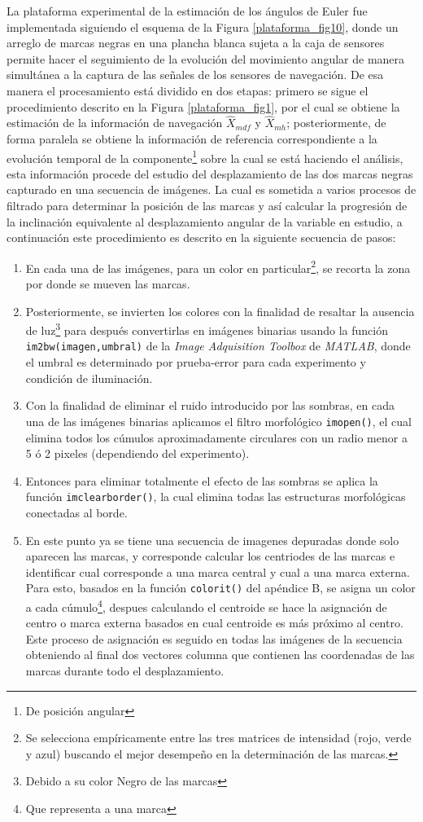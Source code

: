 \documentclass[conference]{IEEEtran}
\begin{document}
\begin{enumerate}
La plataforma experimental de la estimación de los ángulos de Euler fue implementada siguiendo el esquema de la Figura \ref{plataforma_fig10}, donde un arreglo de marcas negras en una plancha blanca sujeta a la caja de sensores permite hacer el seguimiento de la evolución del movimiento angular de manera simultánea a la captura de las señales de los sensores de navegación. De esa manera el procesamiento está dividido en dos etapas: primero se sigue el procedimiento descrito en la Figura \ref{plataforma_fig1}, por el cual se obtiene la estimación de la información de navegación $\hat{X}_{mdf}$ y $\hat{X}_{mh}$; posteriormente, de forma paralela se obtiene la información de referencia correspondiente a la evolución temporal de la componente\footnote{De posición angular} sobre la cual se está haciendo el análisis, esta información procede del estudio del desplazamiento de las dos marcas negras capturado en una secuencia de imágenes. La cual es sometida a varios procesos de filtrado para determinar la posición de las marcas y así calcular la progresión de la inclinación equivalente al desplazamiento angular de la variable en estudio, a continuación este procedimiento es descrito en la siguiente secuencia de pasos:
\begin{enumerate}
\item En cada una de las imágenes, para un color en particular\footnote{Se selecciona empíricamente entre las tres matrices de intensidad (rojo, verde y azul) buscando el mejor desempeño en la determinación de las marcas.},  se recorta la zona por donde se mueven las marcas. 
\item Posteriormente, se invierten los colores con la finalidad de resaltar la ausencia de luz\footnote{Debido a su color Negro de las marcas} para después convertirlas en imágenes binarias usando la función \texttt{im2bw(imagen,umbral)} de la \textsl{Image Adquisition Toolbox} de \textsl{MATLAB}, donde el umbral es determinado por prueba-error para cada experimento y condición de iluminación.
\item Con la finalidad de eliminar el ruido introducido por las sombras, en cada una de las imágenes binarias aplicamos el filtro morfológico \texttt{imopen()}, el cual elimina todos los cúmulos aproximadamente circulares con un radio menor a 5 ó 2 pixeles (dependiendo del experimento).
\item Entonces para eliminar totalmente el efecto de las sombras se aplica la función \texttt{imclearborder()}, la cual elimina todas las estructuras morfológicas conectadas al borde.
\item En este punto ya se tiene una secuencia de imagenes depuradas donde solo aparecen las marcas, y corresponde calcular los centriodes de las marcas e identificar cual corresponde a una marca central y cual a una marca externa. Para esto, basados en la función \texttt{colorit()} del apéndice B, se asigna un color a  cada cúmulo\footnote{Que representa a una marca}, despues calculando el centroide se hace la asignación de centro o marca externa basados en cual centroide es más próximo al centro. Este proceso de asignación es seguido en todas las imágenes de la secuencia obteniendo al final dos vectores columna que contienen las coordenadas de las marcas durante todo el desplazamiento.

\end{enumerate}
\end{enumerate}
\end{document}
